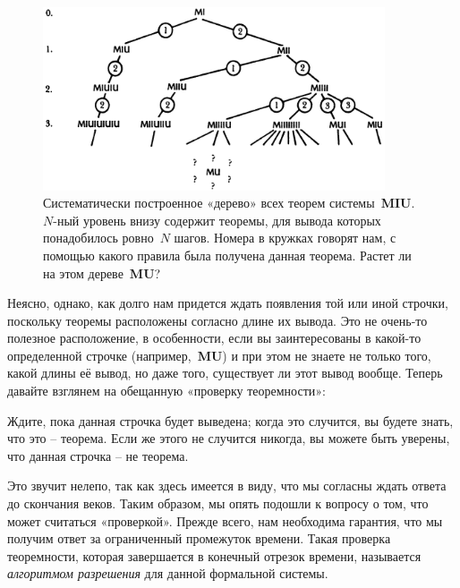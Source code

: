 \documentclass[../main.tex]{subfiles}
\begin{document}
\begin{figure}
    \centering
    \includegraphics[width=0.9\textwidth]{img/miu-tree.png}
    \caption{Систематически построенное «дерево» всех теорем системы~\textbf{MIU}. {$N$-ный} уровень внизу содержит теоремы, для вывода которых понадобилось ровно~$N$ шагов. Номера в кружках говорят нам, с помощью какого правила была получена данная теорема. Растет ли на этом дереве~\textbf{MU}?}
    \label{fig:miu-tree}
\end{figure}

Неясно, однако, как долго нам придется ждать появления той или иной строчки, поскольку теоремы расположены согласно длине их вывода. Это не очень-то полезное расположение, в особенности, если вы заинтересованы в какой-то определенной строчке (например,~\textbf{MU}) и при этом не знаете не только того, какой длины её вывод, но даже того, существует ли этот вывод вообще. Теперь давайте взглянем на обещанную «проверку теоремности»:

Ждите, пока данная строчка будет выведена; когда это случится, вы будете знать, что это \--- теорема. Если же этого не случится никогда, вы можете быть уверены, что данная строчка \--- не теорема.

Это звучит нелепо, так как здесь имеется в виду, что мы согласны ждать ответа до скончания веков. Таким образом, мы опять подошли к вопросу о том, что может считаться «проверкой». Прежде всего, нам необходима гарантия, что мы получим ответ за ограниченный промежуток времени. Такая проверка теоремности, которая завершается в конечный отрезок времени, называется \emph{алгоритмом разрешения} для данной формальной системы.
\end{document}
